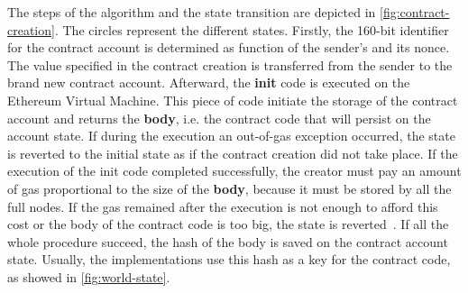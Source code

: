 The steps of the algorithm and the state transition are depicted in
\autoref{fig:contract-creation}. The circles represent the different states.
Firstly, the 160-bit identifier for the contract account is determined as
function of the sender's and its nonce. The value specified in the contract
creation is transferred from the sender to the brand new contract account.
Afterward, the \textbf{init} code is executed on the Ethereum Virtual Machine.
This  piece of code initiate the storage of the contract account and returns the
\textbf{body}, i.e. the contract code that will persist on the account state. If
during the execution an out-of-gas exception occurred, the state is reverted to
the initial state as if the contract creation did not take place. If the
execution of the init code completed successfully, the creator must pay an
amount of gas proportional to the size of the \textbf{body}, because it must be
stored by all the full nodes. If the gas remained after the execution is not
enough to afford this cost or the body of the contract code is too big, the
state is reverted~\cite{wood2018ethereum}. If all the whole procedure succeed,
the hash of the body is saved on the contract account state. Usually, the
implementations use this hash as a key for the contract code, as showed in
\autoref{fig:world-state}.

